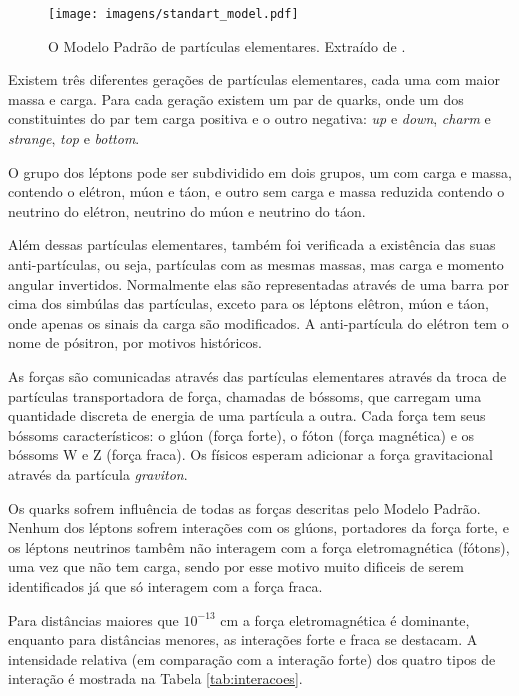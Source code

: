 \begin{figure}[h!t]
\centering
\texttt{[image: imagens/standart\_model.pdf]}
\caption{O Modelo Padrão de partículas elementares. Extraído de
\cite{wiki_standart_model}.}
\label{fig:modelo_padrao}
\end{figure}

Existem três diferentes gerações de partículas elementares, cada uma com maior
massa e carga. Para cada geração existem um par de quarks, onde um dos
constituintes do par tem carga positiva e o outro negativa: \emph{up} e
\emph{down}, \emph{charm} e \emph{strange}, \emph{top} e \emph{bottom}.

O grupo dos léptons pode ser subdividido em dois grupos, um com carga e massa, contendo
o elétron, múon e táon, e outro sem carga e massa reduzida contendo o
neutrino do elétron, neutrino do múon e neutrino do táon.

Além dessas partículas elementares, também foi verificada a existência das suas
anti-partículas, ou seja, partículas com as mesmas massas, mas
carga e momento angular invertidos. Normalmente elas são 
representadas através de uma barra por cima dos simbúlas das partículas, exceto
para os léptons elêtron, múon e táon, onde apenas os sinais da carga são
modificados. A anti-partícula do elétron tem o nome de pósitron, por motivos
históricos.

As forças são comunicadas através das partículas elementares através da troca de
partículas transportadora de força, chamadas de bóssoms, que carregam uma
quantidade discreta de energia de uma partícula a outra. Cada força tem seus
bóssoms característicos: o glúon (força forte), o fóton (força magnética) e os
bóssoms W e Z (força fraca). Os físicos esperam adicionar a força gravitacional
através da partícula \emph{graviton}.

Os quarks sofrem influência de todas as forças descritas pelo Modelo Padrão.
Nenhum dos léptons sofrem interações com os glúons, portadores da força forte, e
os léptons neutrinos tambêm não interagem com a força eletromagnética (fótons), uma vez
que não tem carga, sendo por esse motivo muito dificeis de serem identificados
já que só interagem com a força fraca.

Para distâncias maiores que $10^{-13}$ cm a força eletromagnética é dominante,
enquanto para distâncias menores, as interações forte e fraca se destacam. A
intensidade relativa (em comparação com a interação forte) dos quatro tipos de
interação é mostrada na Tabela \ref{tab:interacoes}.

